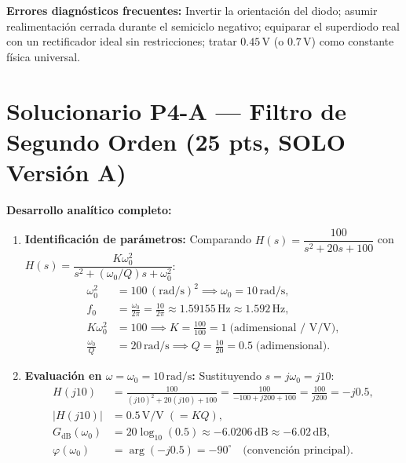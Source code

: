 \documentclass[10pt, a4paper]{article}
\begin{document}
\noindent\textbf{Errores diagnósticos frecuentes:} Invertir la orientación del diodo; asumir realimentación cerrada durante el semiciclo negativo; equiparar el superdiodo real con un rectificador ideal sin restricciones; tratar $0.45\,\mathrm{V}$ (o $0.7\,\mathrm{V}$) como constante física universal.

\section*{Solucionario P4-A --- Filtro de Segundo Orden (25 pts, SOLO Versión A)}

\textbf{Desarrollo analítico completo:}
\begin{enumerate}
    \renewcommand{\labelenumi}{(\alph{enumi})}
    \setlength{\itemsep}{3pt}
    \item \textbf{Identificación de parámetros:} Comparando $H(s) = \dfrac{100}{s^2 + 20s + 100}$ con $H(s) = \dfrac{K\omega_0^2}{s^2 + (\omega_0/Q)s + \omega_0^2}$:
    \begin{align}
        \omega_0^2 &= 100\,\mathrm{(rad/s)^2} \implies \omega_0 = 10\,\mathrm{rad/s}, \\
        f_0 &= \frac{\omega_0}{2\pi} = \frac{10}{2\pi} \approx 1.59155\,\mathrm{Hz} \approx 1.592\,\mathrm{Hz}, \\
        K\omega_0^2 &= 100 \implies K = \frac{100}{100} = 1\;\text{(adimensional / }\mathrm{V/V}\text{)}, \\
        \frac{\omega_0}{Q} &= 20\,\mathrm{rad/s} \implies Q = \frac{10}{20} = 0.5\;\text{(adimensional)}.
    \end{align}
    \item \textbf{Evaluación en $\omega = \omega_0 = 10\,\mathrm{rad/s}$:} Sustituyendo $s = j\omega_0 = j10$:
    \begin{align}
        H(j10) &= \frac{100}{(j10)^2 + 20(j10) + 100} = \frac{100}{-100 + j200 + 100} = \frac{100}{j200} = -j0.5, \\
        |H(j10)| &= 0.5\,\mathrm{V/V}\; (= KQ), \\
        G_{\mathrm{dB}}(\omega_0) &= 20\log_{10}(0.5) \approx -6.0206\,\mathrm{dB} \approx -6.02\,\mathrm{dB}, \\
        \varphi(\omega_0) &= \arg(-j0.5) = -90^\circ \quad \text{(convención principal)}.
    \end{align}

\end{enumerate}
\end{document}
